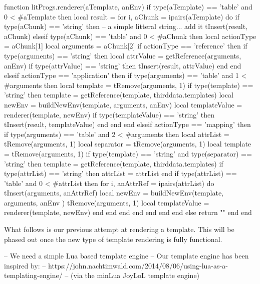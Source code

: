 {{\startLuaCode
function litProgs.renderer(aTemplate, anEnv)
  if type(aTemplate) == 'table' and 0 < #aTemplate then
    local result = { }
    for i, aChunk = ipairs(aTemplate) do
      if type(aChunk) == 'string' then
        -- a simple litteral string... add it
        tInsert(result, aChunk)
      elseif type(aChunk) == 'table' and 0 < #aChunk then
        local actionType = aChunk[1]
        local arguments  = aChunk[2]
        if actionType == 'reference' then
          if type(arguments) == 'string' then
            local attrValue = getReference(arguments, anEnv)
            if type(attrValue) == 'string' then
              tInsert(result, attrValue)
            end
          end
        elseif actionType == 'application' then
          if type(arguments) == 'table' and 1 < #arguments then
            local template = tRemove(arguments, 1)
            if type(template) == 'string' then
              template = getReference(template, thirddata.templates)
              local newEnv = buildNewEnv(template, arguments, anEnv)
              local templateValue = renderer(template, newEnv)
              if type(templateValue) == 'string' then
                tInsert(result, templateValue)
              end
            end
          end
        elseif actionType == 'mapping' then
          if type(arguments) == 'table' and 2 < #arguments then
            local attrList  = tRemove(arguments, 1)
            local separator = tRemove(arguments, 1)
            local template  = tRemove(arguments, 1)
            if type(template) == 'string' and type(separator) == 'string' then
              template = getReference(template, thirddata.templates)
              if type(attrList) == 'string' then
                attrList = { attrList }
              end
              if type(attrList) == 'table' and 0 < #attrList then
                for i, anAttrRef = ipairs(attrList) do
                  tInsert(arguments, anAttrRef)
                  local newEnv = buildNewEnv(template, arguments, anEnv )
                  tRemove(arguments, 1)
                  local templateValue = renderer(template, newEnv)
                end
              end
            end
          end
        end
      end
    end
  else
    return ""
  end
end
\stopLuaCode

What follows is our previous attempt at rendering a template. This will be 
phased out once the new type of template rendering is fully functional. 

\startLuaCode

-- We need a simple Lua based template engine
-- Our template engine has been inspired by:
--   https://john.nachtimwald.com/2014/08/06/using-lua-as-a-templating-engine/
-- (via the minLua JoyLoL template engine)

}}
